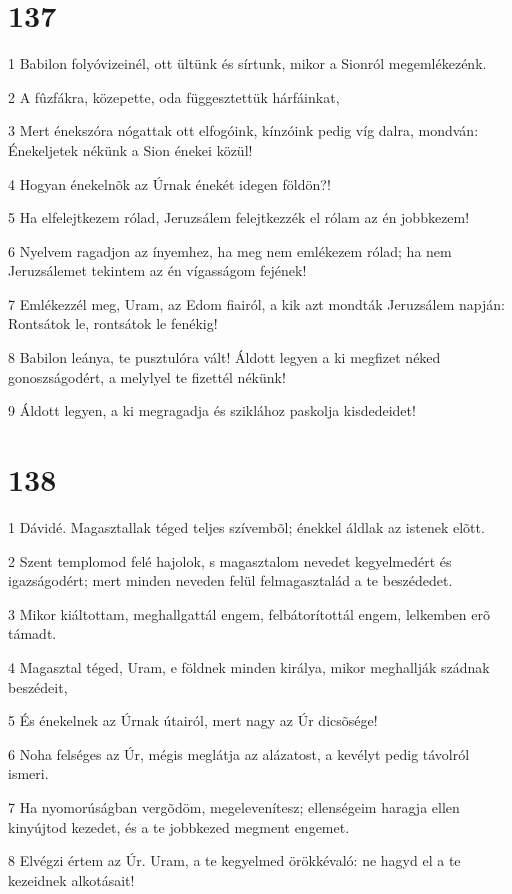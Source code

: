 \chapter{137}

\par 1 Babilon folyóvizeinél, ott ültünk és sírtunk, mikor a Sionról megemlékezénk.
\par 2 A fûzfákra, közepette, oda függesztettük hárfáinkat,
\par 3 Mert énekszóra nógattak ott elfogóink, kínzóink pedig víg dalra, mondván: Énekeljetek nékünk a Sion énekei közül!
\par 4 Hogyan énekelnõk az Úrnak énekét idegen földön?!
\par 5 Ha elfelejtkezem rólad, Jeruzsálem felejtkezzék el rólam az én jobbkezem!
\par 6 Nyelvem ragadjon az ínyemhez, ha meg nem emlékezem rólad; ha nem Jeruzsálemet tekintem az én vígasságom fejének!
\par 7 Emlékezzél meg, Uram, az Edom fiairól, a kik azt mondták Jeruzsálem napján: Rontsátok le, rontsátok le fenékig!
\par 8 Babilon leánya, te pusztulóra vált! Áldott legyen a ki megfizet néked gonoszságodért, a melylyel te fizettél nékünk!
\par 9 Áldott legyen, a ki megragadja és sziklához paskolja kisdedeidet!

\chapter{138}

\par 1 Dávidé. Magasztallak téged teljes szívembõl; énekkel áldlak az istenek elõtt.
\par 2 Szent templomod felé hajolok, s magasztalom nevedet kegyelmedért és igazságodért; mert minden neveden felül felmagasztalád a te beszédedet.
\par 3 Mikor kiáltottam, meghallgattál engem, felbátorítottál engem, lelkemben erõ támadt.
\par 4 Magasztal téged, Uram, e földnek minden királya, mikor meghallják szádnak beszédeit,
\par 5 És énekelnek az Úrnak útairól, mert nagy az Úr dicsõsége!
\par 6 Noha felséges az Úr, mégis meglátja az alázatost, a kevélyt pedig távolról ismeri.
\par 7 Ha nyomorúságban vergõdöm, megelevenítesz; ellenségeim haragja ellen kinyújtod kezedet, és a te jobbkezed megment engemet.
\par 8 Elvégzi értem az Úr. Uram, a te kegyelmed örökkévaló: ne hagyd el a te kezeidnek alkotásait!

